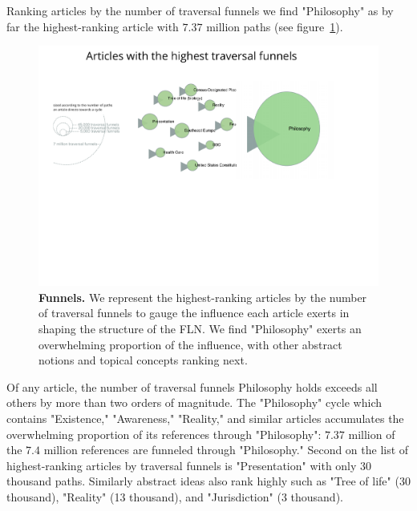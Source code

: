 \documentclass[pre,twocolumn,twoside,superscriptaddress,floatfix, aps, 10pt]{revtex4-1}
\begin{document}
Ranking articles by the number of traversal funnels we find 
"Philosophy" as by far the highest-ranking article with 
$7.37$ million paths
(see figure~\ref{fig:Funnels}).
\begin{figure}[tp!]
  \centering	
  \includegraphics[width=\textwidth]{graphics/funnels.pdf}
  \caption{
    \textbf{Funnels.}
    We represent the highest-ranking articles by the number of traversal 
    funnels to gauge the influence each article exerts in shaping the 
    structure of the FLN. We find "Philosophy" exerts an overwhelming proportion
    of the influence, with other abstract notions and topical concepts ranking
    next.
  }
  \label{fig:Funnels}
\end{figure}
Of any article, the number of traversal funnels Philosophy holds exceeds 
all others by more than two orders of magnitude.
The "Philosophy" cycle which contains "Existence," "Awareness," "Reality," 
and similar articles accumulates the overwhelming proportion of its 
references through "Philosophy": $7.37$ million of the $7.4$ million references
are funneled through "Philosophy."
Second on the list of highest-ranking articles by traversal funnels is 
"Presentation" with only $30$ thousand paths. Similarly abstract 
ideas also rank highly such as "Tree of life" (30 thousand), 
"Reality" (13 thousand), and "Jurisdiction" (3 thousand).
\end{document}
